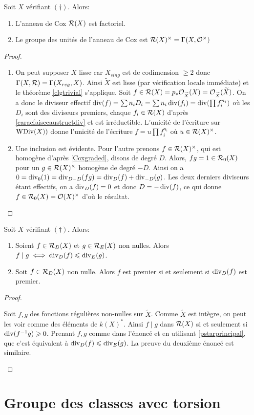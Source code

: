 \begin{prop}
Soit $X$ vérifiant $(\dagger)$. Alors:
\begin{enumerate}
\item L'anneau de Cox $\mathcal{R}(X)$ est factoriel.
\item Le groupe des unités de l'anneau de Cox est $\mathcal{R}(X)^\times=\Gamma(X,\mathcal{O}^\times)$
\end{enumerate}
\end{prop}
\begin{proof}
\begin{enumerate}
\item On peut supposer $X$ lisse car $X_{sing}$ est de codimension $\geq 2$ donc $\Gamma(X, \mathcal{R})=\Gamma(X_{reg}, X)$. Ainsi $\widetilde{X}$ est lisse (par vérification locale immédiate) et le théorème \ref{clgtrivial} s'applique. Soit $f\in \mathcal{R}(X)=p_*\mathcal{O}_{\widetilde{X}}(X)=\mathcal{O}_{\widetilde{X}}(\widetilde{X})$. On a donc le diviseur effectif $\operatorname{div}(f)= \sum n_iD_i=\sum n_i\operatorname{div}(f_i)=\operatorname{div}(\prod f_i^{n_i})$ où les $D_i$ sont des diviseurs premiers, chaque $f_i\in \mathcal{R}(X)$ d'après \ref{caracfaisceaustructdiv} et est irréductible. L'unicité de l'écriture sur $\operatorname{WDiv}(X))$ donne l'unicité de l'écriture $f=u\prod f_i^{n_i}$ où $u\in \mathcal{R}(X)^\times$.
\item Une inclusion est évidente. Pour l'autre prenons $f\in\mathcal{R}(X)^\times$, qui est homogène d'après \ref{Coxgraded}, disons de degré $D$. Alors, $fg=1\in \mathcal{R}_0(X)$ pour un $g\in\mathcal{R}(X)^\times$ homogène de degré $-D$. Ainsi on a $0=\operatorname{div}_0(1)=\operatorname{div}_{D-D}(fg)=\operatorname{div}_D(f)+\operatorname{div}_{-D}(g)$. Les deux derniers diviseurs étant effectifs, on a $\operatorname{div}_D(f)=0$ et donc $D=-\operatorname{div}(f)$, ce qui donne $f\in\mathcal{R}_0(X)=\mathcal{O}(X)^\times$ d'où le résultat.
\end{enumerate}
\end{proof}

\begin{prop}
Soit $X$ vérifiant $(\dagger)$. Alors:
\begin{enumerate}
\item Soient $f\in \mathcal{R}_D(X)$ et $g\in \mathcal{R}_E(X)$ non nulles. Alors $f\mid g\iff \operatorname{div}_D(f)\leqslant\operatorname{div}_E(g)$.
\item Soit $f\in \mathcal{R}_D(X)$ non nulle. Alors $f$ est premier si et seulement si $\operatorname{div}_D(f)$ est premier.
\end{enumerate}
\end{prop}
\begin{proof}
\begin{enumerate}
Soit $f,g$ des fonctions régulières non-nulles sur $\widetilde{X}$. Comme $\widetilde{X}$ est intègre, on peut les voir comme des éléments de $k(X)^*$. Ainsi $f\mid g$ dans $\mathcal{R}(X)$ si et seulement si $\operatorname{div}(f^{-1}g)\geqslant 0$. Prenant $f,g$ comme dans l'énoncé et en utilisant \ref{pstarprincipal}, que c'est équivalent à $\operatorname{div}_D(f)\leqslant\operatorname{div}_E(g)$. La preuve du deuxième énoncé est similaire.
\end{enumerate}
\end{proof}

\section{Groupe des classes avec torsion}

